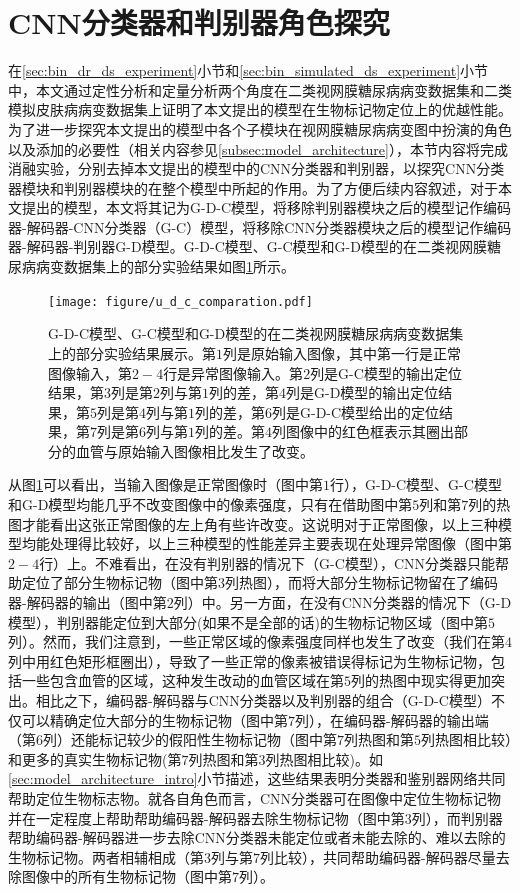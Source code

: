\section{CNN分类器和判别器角色探究}\label{sec:g_c_g_d_g_d_c_comparsion}
在\ref{sec:bin_dr_ds_experiment}小节和\ref{sec:bin_simulated_ds_experiment}小节中，本文通过定性分析和定量分析两个角度在二类视网膜糖尿病病变数据集和二类模拟皮肤病病变数据集上证明了本文提出的模型在生物标记物定位上的优越性能。为了进一步探究本文提出的模型中各个子模块在视网膜糖尿病病变图中扮演的角色以及添加的必要性（相关内容参见\ref{subsec:model_architecture}），本节内容将完成消融实验，分别去掉本文提出的模型中的CNN分类器和判别器，以探究CNN分类器模块和判别器模块的在整个模型中所起的作用。为了方便后续内容叙述，对于本文提出的模型，本文将其记为G-D-C模型，将移除判别器模块之后的模型记作编码器-解码器-CNN分类器（G-C）模型，将移除CNN分类器模块之后的模型记作编码器-解码器-判别器G-D模型。G-D-C模型、G-C模型和G-D模型的在二类视网膜糖尿病病变数据集上的部分实验结果如图\ref{fig:u_d_c_comparation}所示。
\begin{figure}[h]
	\centering
	\texttt{[image: figure/u\_d\_c\_comparation.pdf]}
	\caption{G-D-C模型、G-C模型和G-D模型的在二类视网膜糖尿病病变数据集上的部分实验结果展示。第$1$列是原始输入图像，其中第一行是正常图像输入，第$2-4$行是异常图像输入。第$2$列是G-C模型的输出定位结果，第$3$列是第$2$列与第$1$列的差，第$4$列是G-D模型的输出定位结果，第$5$列是第$4$列与第$1$列的差，第$6$列是G-D-C模型给出的定位结果，第$7$列是第$6$列与第$1$列的差。第$4$列图像中的红色框表示其圈出部分的血管与原始输入图像相比发生了改变。} 
	\label{fig:u_d_c_comparation}
\end{figure}

从图\ref{fig:u_d_c_comparation}可以看出，当输入图像是正常图像时（图中第$1$行），G-D-C模型、G-C模型和G-D模型均能几乎不改变图像中的像素强度，只有在借助图中第$5$列和第$7$列的热图才能看出这张正常图像的左上角有些许改变。这说明对于正常图像，以上三种模型均能处理得比较好，以上三种模型的性能差异主要表现在处理异常图像（图中第$2-4$行）上。不难看出，在没有判别器的情况下（G-C模型），CNN分类器只能帮助定位了部分生物标记物（图中第$3$列热图），而将大部分生物标记物留在了编码器-解码器的输出（图中第$2$列）中。另一方面，在没有CNN分类器的情况下（G-D模型），判别器能定位到大部分(如果不是全部的话)的生物标记物区域（图中第$5$列）。然而，我们注意到，一些正常区域的像素强度同样也发生了改变（我们在第$4$列中用红色矩形框圈出），导致了一些正常的像素被错误得标记为生物标记物，包括一些包含血管的区域，这种发生改动的血管区域在第$5$列的热图中现实得更加突出。相比之下，编码器-解码器与CNN分类器以及判别器的组合（G-D-C模型）不仅可以精确定位大部分的生物标记物（图中第$7$列），在编码器-解码器的输出端（第$6$列）还能标记较少的假阳性生物标记物（图中第$7$列热图和第$5$列热图相比较）和更多的真实生物标记物(第$7$列热图和第$3$列热图相比较)。如\ref{sec:model_architecture_intro}小节描述，这些结果表明分类器和鉴别器网络共同帮助定位生物标志物。就各自角色而言，CNN分类器可在图像中定位生物标记物并在一定程度上帮助帮助编码器-解码器去除生物标记物（图中第$3$列），而判别器帮助编码器-解码器进一步去除CNN分类器未能定位或者未能去除的、难以去除的生物标记物。两者相辅相成（第$3$列与第$7$列比较），共同帮助编码器-解码器尽量去除图像中的所有生物标记物（图中第$7$列）。

